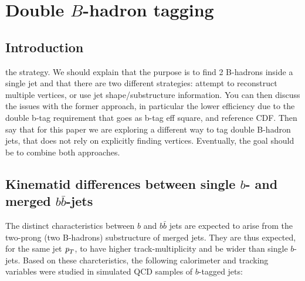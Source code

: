 %
%
\chapter{Double $B$-hadron tagging}

\section{Introduction}\label{sec:gbbintro}

the strategy. We should explain that the purpose is to find 2 B-hadrons inside a single jet and that there are two different strategies: attempt to reconstruct multiple vertices, or use jet shape/substructure information. You can then discuss the issues with the former approach, in particular the lower efficiency due to the double b-tag requirement that goes as b-tag eff square, and reference CDF. Then say that for this paper we are exploring a different way to tag double B-hadron jets, that does not rely on explicitly finding vertices. Eventually, the goal should be to combine both approaches.


\section{Kinematid differences between single $b$- and merged $b\bar{b}$-jets}\label{sec:gbbKine}
The distinct characteristics between $b$ and $b \bar{b}$ jets are expected to arise from the two-prong (two B-hadrons) substructure of merged jets.  They are thus expected, for the same jet ${\emph{p}_{T}}$, to have higher track-multiplicity and be wider than single $b$-jets. Based on these charcteristics, the following calorimeter and tracking variables were studied in simulated QCD samples of $b$-tagged jets:


